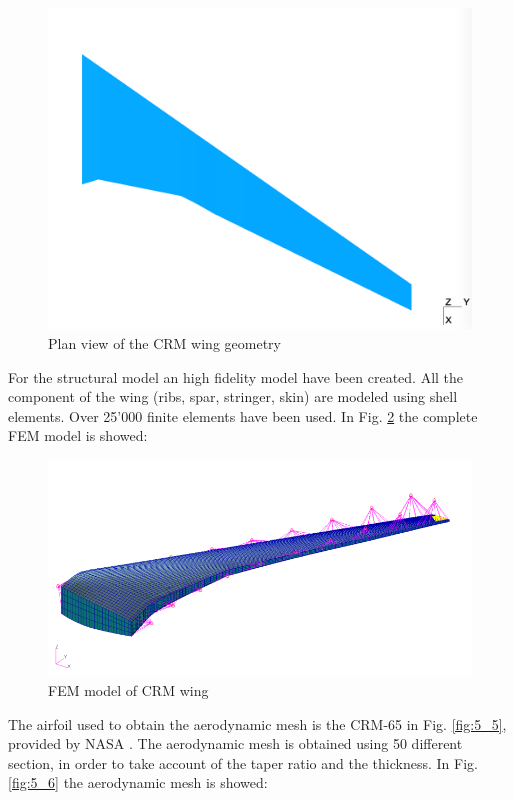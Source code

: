 \begin{figure}[H]
	\centering
	\includegraphics[width = 1\textwidth]{./Immagini/5_4.png}
	\caption{Plan view of the CRM wing geometry}
	\label{fig:5_3}
\end{figure}
For the structural model an high fidelity model have been created. All the component of the wing (ribs, spar, stringer, skin) are modeled using shell elements. Over 25'000 finite elements have been used. In Fig. \ref{fig:5_4} the complete FEM model is showed:
\begin{figure}[H]
	\centering
	\includegraphics[width = 1\textwidth]{./Immagini/5_5.png}
	\caption{FEM model of CRM wing}
	\label{fig:5_4}
\end{figure}
The airfoil used to obtain the aerodynamic mesh is the CRM-65 in Fig. \ref{fig:5_5}, provided by NASA \cite{air}. The aerodynamic mesh is obtained using 50 different section, in order to take account of the taper ratio and the thickness. In Fig. \ref{fig:5_6} the aerodynamic mesh is showed:

